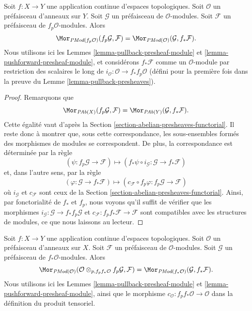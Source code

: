 \begin{lemma}
\label{lemma-adjoint-push-pull-presheaves-modules}
Soit $f : X \to Y$ une application continue d'espaces topologiques.
Soit $\mathcal{O}$ un préfaisceau d'anneaux sur $Y$.
Soit $\mathcal{G}$ un préfaisceau de $\mathcal{O}$-modules.
Soit $\mathcal{F}$ un préfaisceau de $f_p\mathcal{O}$-modules.
Alors
$$
\Mor_{\textit{PMod}(f_p\mathcal{O})}(f_p\mathcal{G}, \mathcal{F})
=
\Mor_{\textit{PMod}(\mathcal{O})}(\mathcal{G}, f_*\mathcal{F}).
$$
Nous utilisons ici
les Lemmes \ref{lemma-pullback-presheaf-module}
et \ref{lemma-pushforward-presheaf-module}, et considérons
$f_*\mathcal{F}$ comme un $\mathcal{O}$-module par restriction des scalaires le long de
$i_\mathcal{O} : \mathcal{O} \to f_*f_p\mathcal{O}$
(défini pour la première fois dans la preuve du Lemme \ref{lemma-pullback-presheaves}).
\end{lemma}

\begin{proof}
Remarquons que
$$
\Mor_{\textit{PAb}(X)}(f_p\mathcal{G}, \mathcal{F})
=
\Mor_{\textit{PAb}(Y)}(\mathcal{G}, f_*\mathcal{F}).
$$
Cette égalité vaut d'après la Section \ref{section-abelian-presheaves-functorial}.
Il reste donc à montrer que, sous cette correspondance, les
sous-ensembles formés des morphismes de modules se correspondent. De plus, la correspondance
est déterminée par la règle
$$
(\psi : f_p\mathcal{G} \to \mathcal{F})
\longmapsto
(f_*\psi \circ i_\mathcal{G} :
\mathcal{G} \to f_* \mathcal{F})
$$
et, dans l'autre sens, par la règle
$$
(\varphi : \mathcal{G} \to f_* \mathcal{F})
\longmapsto
(c_\mathcal{F} \circ f_p\varphi : f_p\mathcal{G} \to \mathcal{F})
$$
où $i_\mathcal{G}$ et $c_\mathcal{F}$ sont ceux de la
Section \ref{section-abelian-presheaves-functorial}.
Ainsi, par fonctorialité de $f_*$ et $f_p$, nous voyons
qu'il suffit de vérifier que les morphismes
$i_\mathcal{G} : \mathcal{G} \to f_* f_p \mathcal{G}$ et
$c_\mathcal{F} : f_p f_* \mathcal{F} \to \mathcal{F}$
sont compatibles avec les structures de modules, ce que nous laissons au lecteur.
\end{proof}

\begin{lemma}
\label{lemma-adjoint-pull-push-presheaves-modules}
Soit $f : X \to Y$ une application continue d'espaces topologiques.
Soit $\mathcal{O}$ un préfaisceau d'anneaux sur $X$.
Soit $\mathcal{F}$ un préfaisceau de $\mathcal{O}$-modules.
Soit $\mathcal{G}$ un préfaisceau de $f_*\mathcal{O}$-modules.
Alors
$$
\Mor_{\textit{PMod}(\mathcal{O})}(
\mathcal{O} \otimes_{p, f_pf_*\mathcal{O}} f_p\mathcal{G}, \mathcal{F})
=
\Mor_{\textit{PMod}(f_*\mathcal{O})}(\mathcal{G}, f_*\mathcal{F}).
$$
Nous utilisons ici
les Lemmes \ref{lemma-pullback-presheaf-module}
et \ref{lemma-pushforward-presheaf-module}, ainsi que
le morphisme $c_\mathcal{O} : f_pf_*\mathcal{O} \to \mathcal{O}$
dans la définition du produit tensoriel.
\end{lemma}

